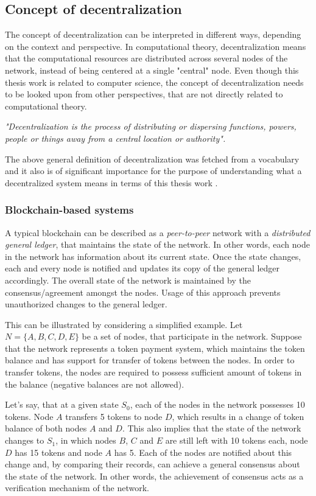 \subsection{Concept of decentralization}
The concept of decentralization can be interpreted in different ways, depending on the context and perspective. In computational theory, decentralization means that the computational resources are distributed across several nodes of the network, instead of being centered at a single "central" node. Even though this thesis work is related to computer science, the concept of decentralization needs to be looked upon from other perspectives, that are not directly related to computational theory. 

\begin{displayquote}
\textit{"Decentralization is the process of distributing or dispersing functions, powers, people or things away from a central location or authority".}
\end{displayquote}

The above general definition of decentralization was fetched from a vocabulary and it also is of significant importance for the purpose of understanding what a decentralized system means in terms of this thesis work \citep{decentralizationdefinition}. 

\subsubsection{Blockchain-based systems}
A typical blockchain can be described as a \emph{\gls{peer-to-peer}} network with a \emph{\gls{distributed general ledger}}, that maintains the state of the network. In other words, each node in the network has information about its current state. Once the state changes, each and every node is notified and updates its copy of the general ledger accordingly. The overall state of the network is maintained by the consensus/agreement amongst the nodes. Usage of this approach prevents unauthorized changes to the general ledger.

This can be illustrated by considering a simplified example. Let $N = \{A, B, C, D, E\}$ be a set of nodes, that participate in the network. Suppose that the network represents a token payment system, which maintains the token balance and has support for transfer of tokens between the nodes. In order to transfer tokens, the nodes are required to possess sufficient amount of tokens in the balance (negative balances are not allowed). 

Let's say, that at a given state $S_0$, each of the nodes in the network possesses 10 tokens. Node $A$ transfers 5 tokens to node $D$, which results in a change of token balance of both nodes $A$ and $D$. This also implies that the state of the network changes to $S_1$, in which nodes $B$, $C$ and $E$ are still left with 10 tokens each, node $D$ has 15 tokens and node $A$ has 5. Each of the nodes are notified about this change and, by comparing their records, can achieve a general consensus about the state of the network. In other words, the achievement of consensus acts as a verification mechanism of the network.

